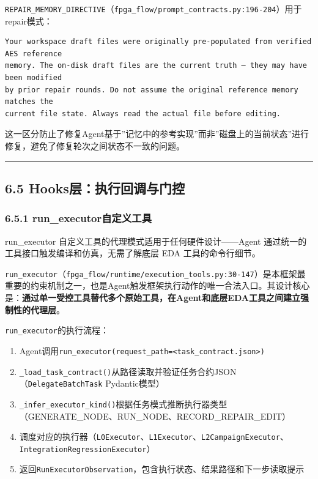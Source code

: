 \texttt{REPAIR\_MEMORY\_DIRECTIVE}（\texttt{fpga\_flow/prompt\_contracts.py:196-204}）用于repair模式：

\begin{verbatim}
Your workspace draft files were originally pre-populated from verified AES reference
memory. The on-disk draft files are the current truth — they may have been modified
by prior repair rounds. Do not assume the original reference memory matches the
current file state. Always read the actual file before editing.
\end{verbatim}

这一区分防止了修复Agent基于''记忆中的参考实现''而非''磁盘上的当前状态''进行修复，避免了修复轮次之间状态不一致的问题。

\begin{center}\rule{0.5\linewidth}{0.5pt}\end{center}

\subsection{6.5
Hooks层：执行回调与门控}\label{hooksux5c42ux6267ux884cux56deux8c03ux4e0eux95e8ux63a7}

\subsubsection{6.5.1
run\_executor自定义工具}\label{run_executorux81eaux5b9aux4e49ux5de5ux5177}

run\_executor 自定义工具的代理模式适用于任何硬件设计------Agent
通过统一的工具接口触发编译和仿真，无需了解底层 EDA 工具的命令行细节。

\texttt{run\_executor}（\texttt{fpga\_flow/runtime/execution\_tools.py:30-147}）是本框架最重要的约束机制之一，也是Agent触发框架执行动作的唯一合法入口。其设计核心是：\textbf{通过单一受控工具替代多个原始工具，在Agent和底层EDA工具之间建立强制性的代理层}。

\texttt{run\_executor}的执行流程：

\begin{enumerate}
\def\labelenumi{\arabic{enumi}.}
\tightlist
\item
  Agent调用\texttt{run\_executor(request\_path=\textless{}task\_contract.json\textgreater{})}
\item
  \texttt{\_load\_task\_contract()}从路径读取并验证任务合约JSON（\texttt{DelegateBatchTask}
  Pydantic模型）
\item
  \texttt{\_infer\_executor\_kind()}根据任务模式推断执行器类型（GENERATE\_NODE、RUN\_NODE、RECORD\_REPAIR\_EDIT）
\item
  调度对应的执行器（\texttt{L0Executor}、\texttt{L1Executor}、\texttt{L2CampaignExecutor}、\texttt{IntegrationRegressionExecutor}）
\item
  返回\texttt{RunExecutorObservation}，包含执行状态、结果路径和下一步读取提示
\end{enumerate}

